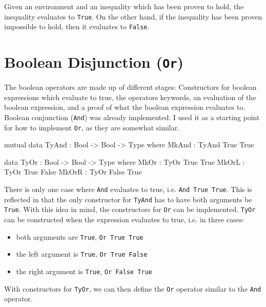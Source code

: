         Given an environment and an inequality which has been proven to hold, the inequality evaluates to \texttt{True}. On the other hand, if the inequality has been proven impossible to hold, then it evaluates to \texttt{False}.
    
    
\section{Boolean Disjunction (\texttt{Or})}\label{des:or}
    The boolean operators are made up of different stages: Constructors for boolean expressions which evaluate to true, the operators keywords, an evaluation of the boolean expression, and a proof of what the boolean expression evaluates to. Boolean conjunction (\texttt{And}) was already implemented. I used it as a starting point for how to implement \texttt{Or}, as they are somewhat similar.
    
    \begin{code}[label={des:tyand-or}, caption={The constructors for true \texttt{And} and \texttt{Or} statements}, escapeinside={(*}{*)}]
        mutual
            data TyAnd : Bool -> Bool -> Type where
                MkAnd  : TyAnd True True
            
            data TyOr : Bool -> Bool -> Type where
                MkOr  : TyOr True True
                MkOrL : TyOr True False
                MkOrR : TyOr False True
    \end{code}

    There is only one case where \texttt{And} evaluates to true, i.e. \texttt{And True True}. This is reflected in that the only constructor for \texttt{TyAnd} has to have both arguments be \texttt{True}. With this idea in mind, the constructors for \texttt{Or} can be implemented. \texttt{TyOr} can be constructed when the expression evaluates to true, i.e. in three cases:
    \begin{itemize}
        \item both arguments are \texttt{True}, \texttt{Or True True}
        \item the left argument is \texttt{True}, \texttt{Or True False}
        \item the right argument is \texttt{True}, \texttt{Or False True}
    \end{itemize}
    
    With constructors for \texttt{TyOr}, we can then define the \texttt{Or} operator similar to the \texttt{And} operator.
    
